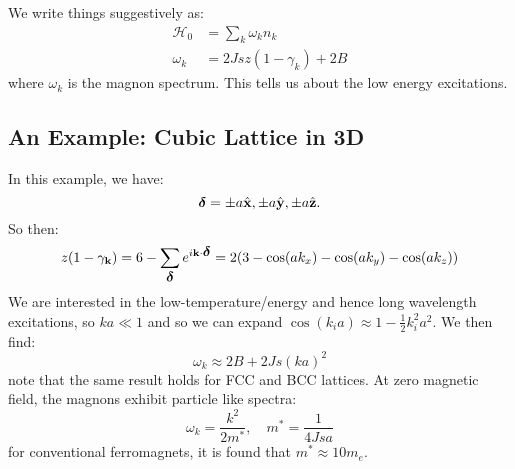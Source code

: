 We write things suggestively as:
\begin{equation}
    \begin{split}
        \mathcal{H}_0 &= \sum_k \omega_k n_k
        \\ \omega_k &= 2Jsz(1 - \gamma_k) + 2B
    \end{split}
\end{equation}
where $\omega_k$ is the magnon spectrum. This tells us about the low energy excitations. 

\subsection{An Example: Cubic Lattice in 3D}
In this example, we have:
\begin{equation}
    \mbox{\boldmath$ \delta $} = \pm a\hat{\mathbf{x}}, \pm a\hat{\mathbf{y}}, \pm a\hat{\mathbf{z}}.
\end{equation}
So then:
\begin{align*}
    z(1-\gamma_{\mathbf{k}}) = 6 - \sum_{\mbox{\boldmath$ \delta $}}e^{i\mathbf{k} \cdot \mbox{\boldmath$ \delta $}} = 2(3 - \cos(ak_x) - \cos(ak_y) - \cos(ak_z))
\end{align*}
We are interested in the low-temperature/energy and hence long wavelength excitations, so $ka \ll 1$ and so we can expand $\cos(k_ia) \approx 1- \frac{1}{2}k_i^2 a^2$. We then find:
\begin{equation}
    \omega_k \approx 2B + 2Js(ka)^2
\end{equation}
note that the same result holds for FCC and BCC lattices. At zero magnetic field, the magnons exhibit particle like spectra:
\begin{equation}
    \omega_k = \frac{k^2}{2m^*}, \quad m^* = \frac{1}{4Jsa}
\end{equation}
for conventional ferromagnets, it is found that $m^* \approx 10m_e$.

